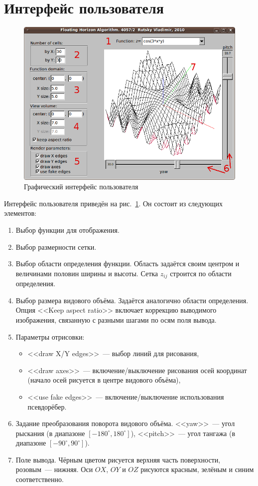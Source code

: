 \documentclass[a4paper,10pt]{article}
\begin{document}
\section{Интерфейс пользователя}
\begin{figure}[h!]
  \centering
  \includegraphics[width=0.8\linewidth]{./screenshots/ui_w-notes.png}
  \caption{Графический интерфейс пользователя}
  \label{fig:gui}
\end{figure}

Интерфейс пользователя приведён на рис.~\ref{fig:gui}.
Он состоит из следующих элементов:
\begin{enumerate}
  \item Выбор функции для отображения.
  \item Выбор размерности сетки.
  \item Выбор области определения функции. 
    Область задаётся своим центром и величинами половин ширины и высоты.
    Сетка $z_{ij}$ строится по области определения.
  \item Выбор размера видового объёма.
    Задаётся аналогично области определения.
    Опция <<Keep aspect ratio>> включает коррекцию выводимого изображения, 
    связанную с разными шагами по осям поля вывода.
  \item Параметры отрисовки:
    \begin{itemize}
      \item <<draw X/Y edges>>~--- выбор линий для рисования,
      \item <<draw axes>>~--- включение/выключение рисования осей координат
        (начало осей рисуется в центре видового объёма),
      \item <<use fake edges>>~--- включение/выключение использования псевдорёбер.
    \end{itemize}
  \item Задание преобразования поворота видового объёма.
    <<yaw>>~--- угол рыскания (в диапазоне $[-180^{\circ}, 180^{\circ}]$),
    <<pitch>>~--- угол тангажа (в диапазоне $[-90^{\circ}, 90^{\circ}]$).
  \item Поле вывода.
    Чёрным цветом рисуется верхняя часть поверхности, 
    розовым~--- нижняя. 
    Оси $OX$, $OY$ и $OZ$ рисуются красным, зелёным и синим соответственно.
\end{enumerate}
\end{document}
